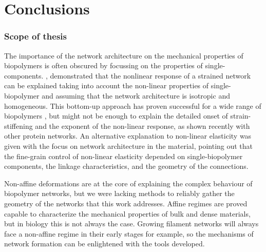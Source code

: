 
\chapter{Conclusions}
\label{Chapter-Conclusions}

\subsection{Scope of thesis}%
\label{sub:scope_of_thesis}

The importance of the network architecture on the mechanical properties of biopolymers is often obscured by focussing on the properties of single-components. \cite{storm_nonlinear_2005}, demonstrated that the nonlinear response of a strained network can be explained taking into account the non-linear properties of single-biopolymer and assuming that the network architecture is isotropic and homogeneous. This bottom-up approach has proven successful for a wide range of biopolymers \cite{carrillo_nonlinear_2013}, but might not be enough to explain the detailed onset of strain-stiffening and the exponent of the non-linear response, as shown recently with other protein networks\cite{licup_stress_2015}. An alternative explanation to non-linear elasticity was given with the focus on network architecture in the material\cite{onck_alternative_2005}, pointing out that the fine-grain control of non-linear elasticity depended on single-biopolymer components, the linkage characteristics, and the geometry of the connections.


Non-affine deformations are at the core of explaining the complex behaviour of biopolymer networks, but we were lacking methods to reliably gather the geometry of the networks that this work addresses. Affine regimes are proved capable to characterize the mechanical properties of bulk and dense materials, but in biology this is not always the case. Growing filament networks will always face a non-affine regime in their early stages for example, so the mechanisms of network formation can be enlightened with the tools developed.

